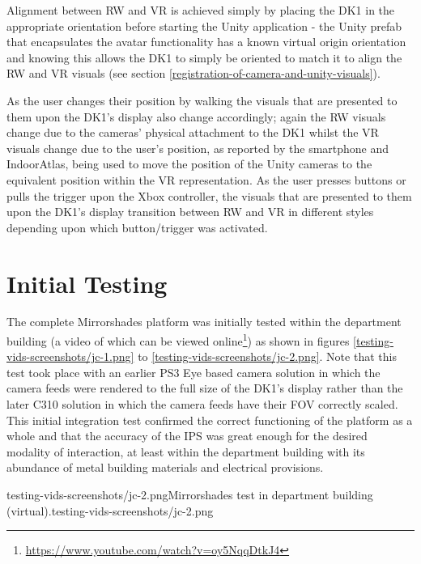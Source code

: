 Alignment between RW and VR is achieved simply by placing the DK1 in the appropriate orientation before starting the Unity application - the Unity prefab that encapsulates the avatar functionality has a known virtual origin orientation and knowing this allows the DK1 to simply be oriented to match it to align the RW and VR visuals (see section \ref{registration-of-camera-and-unity-visuals}).

As the user changes their position by walking the visuals that are presented to them upon the DK1's display also change accordingly; again the RW visuals change due to the cameras' physical attachment to the DK1 whilst the VR visuals change due to the user's position, as reported by the smartphone and IndoorAtlas, being used to move the position of the Unity cameras to the equivalent position within the VR representation. As the user presses buttons or pulls the trigger upon the Xbox controller, the visuals that are presented to them upon the DK1's display transition between RW and VR in different styles depending upon which button/trigger was activated.


\section{Initial Testing}
\label{initial-testing}
The complete Mirrorshades platform was initially tested within the department building (a video of which can be viewed online\footnote{\url{https://www.youtube.com/watch?v=oy5NqqDtkJ4}}) as shown in figures \ref{testing-vids-screenshots/jc-1.png} to \ref{testing-vids-screenshots/jc-2.png}. Note that this test took place with an earlier PS3 Eye based camera solution in which the camera feeds were rendered to the full size of the DK1's display rather than the later C310 solution in which the camera feeds have their FOV correctly scaled. This initial integration test confirmed the correct functioning of the platform as a whole and that the accuracy of the IPS was great enough for the desired modality of interaction, at least within the department building with its abundance of metal building materials and electrical provisions.

       {testing-vids-screenshots/jc-2.png}{Mirrorshades test in department building (virtual).}{testing-vids-screenshots/jc-2.png}

